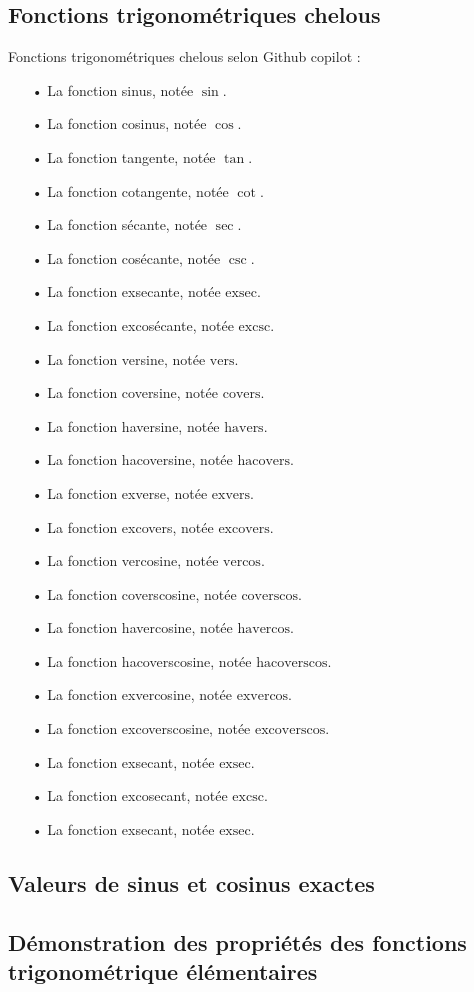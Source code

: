 \documentclass[a4paper]{article}
\begin{document}
		\subsection*{Fonctions trigonométriques chelous} \label{fonction_trigo_chelous}

		Fonctions trigonométriques chelous selon Github copilot :

		\begin{itemize}
				\item [•] La fonction sinus, notée $\sin$.
				\item [•] La fonction cosinus, notée $\cos$.
				\item [•] La fonction tangente, notée $\tan$.
				\item [•] La fonction cotangente, notée $\cot$.
				\item [•] La fonction sécante, notée $\sec$.
				\item [•] La fonction cosécante, notée $\csc$.
				\item [•] La fonction exsecante, notée $\text{exsec}$.
				\item [•] La fonction excosécante, notée $\text{excsc}$.
				\item [•] La fonction versine, notée $\text{vers}$.
				\item [•] La fonction coversine, notée $\text{covers}$.
				\item [•] La fonction haversine, notée $\text{havers}$.
				\item [•] La fonction hacoversine, notée $\text{hacovers}$.
				\item [•] La fonction exverse, notée $\text{exvers}$.
				\item [•] La fonction excovers, notée $\text{excovers}$.
				\item [•] La fonction vercosine, notée $\text{vercos}$.
				\item [•] La fonction coverscosine, notée $\text{coverscos}$.
				\item [•] La fonction havercosine, notée $\text{havercos}$.
				\item [•] La fonction hacoverscosine, notée $\text{hacoverscos}$.
				\item [•] La fonction exvercosine, notée $\text{exvercos}$.
				\item [•] La fonction excoverscosine, notée $\text{excoverscos}$.
				\item [•] La fonction exsecant, notée $\text{exsec}$.
				\item [•] La fonction excosecant, notée $\text{excsc}$.
				\item [•] La fonction exsecant, notée $\text{exsec}$.
			\end{itemize}

		\subsection*{Valeurs de sinus et cosinus exactes} \label{valeur_remarquable_trigo}

		\subsection*{Démonstration des propriétés des fonctions trigonométrique élémentaires} \label{demo_propriete_trigo_1}
\end{document}
